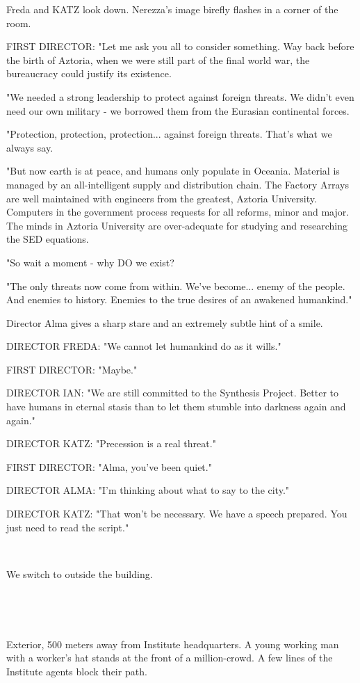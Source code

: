 \documentclass[11pt]{article}
\begin{document}
Freda and KATZ look down. 
Nerezza's image birefly flashes in a corner of the room.

FIRST DIRECTOR: "Let me ask you all to consider something. 
Way back before the birth of Aztoria, when we were still part of the final world war, the bureaucracy could justify its existence.

"We needed a strong leadership to protect against foreign threats.
We didn't even need our own military - we borrowed them from the Eurasian continental forces.

"Protection, protection, protection... against foreign threats. That's what we always say.

"But now earth is at peace, and humans only populate in Oceania.
Material is managed by an all-intelligent supply and distribution chain.
The Factory Arrays are well maintained with engineers from the greatest, Aztoria University.
Computers in the government process requests for all reforms, minor and major. 
The minds in Aztoria University are over-adequate for studying and researching the SED equations.

"So wait a moment - why DO we exist? 

"The only threats now come from within.
We've become... enemy of the people.
And enemies to history.
Enemies to the true desires of an awakened humankind."

Director Alma gives a sharp stare and an extremely subtle hint of a smile.

DIRECTOR FREDA: "We cannot let humankind do as it wills."

FIRST DIRECTOR: "Maybe."

DIRECTOR IAN: "We are still committed to the Synthesis Project.
Better to have humans in eternal stasis than to let them stumble into darkness again and again."

DIRECTOR KATZ: "Precession is a real threat."

FIRST DIRECTOR: "Alma, you've been quiet."

DIRECTOR ALMA: "I'm thinking about what to say to the city."

DIRECTOR KATZ: "That won't be necessary. 
We have a speech prepared. 
You just need to read the script."

\ 

We switch to outside the building.

\ 

\ 

Exterior, 500 meters away from Institute headquarters.
A young working man with a worker's hat stands at the front of a million-crowd.
A few lines of the Institute agents block their path.
\end{document}

